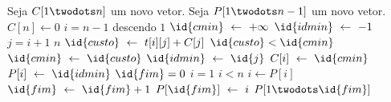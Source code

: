 \begin{codebox}
    \li Seja $C[1 \twodots n]$ um novo vetor.
    \li Seja $P[1 \twodots n - 1]$ um novo vetor.
    \li
    \li $C[n] \gets 0$
    \li {} $i = n - 1$ descendo  $1$
        \Do
    \li     $\id{cmin} \gets +\infty$
    \li     $\id{idmin} \gets -1$
    \li     {} $j = i + 1$  $n$
            \Do
    \li         $\id{custo} \gets t[i][j] + C[j]$
    \li         {} $\id{custo} < \id{cmin}$
                \Then
    \li             $\id{cmin} \gets \id{custo}$
    \li             $\id{idmin} \gets \id{j}$
                \End
            \End
    \li     $C[i] \gets \id{cmin}$
    \li     $P[i] \gets \id{idmin}$
        \End
    \li
    \li $\id{fim} = 0$
    \li $i = 1$
    \li {} $i < n$
        \Do
    \li     $i \gets P[i]$
    \li     $\id{fim} \gets \id{fim} + 1$
    \li     $P[\id{fim}] \gets i$
        \End
    \li
    \li {} $P[1 \twodots \id{fim}]$
\end{codebox}
